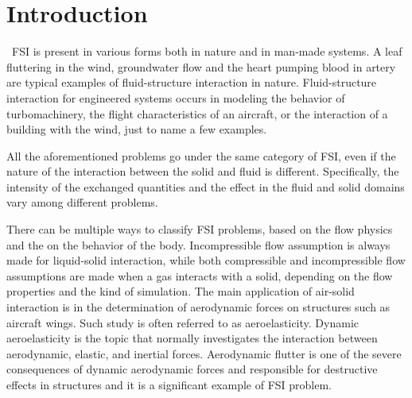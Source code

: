 \chapter{Introduction}
\label{cha:intro}





~\ac{FSI} is present in various forms both in nature and in man-made systems. A leaf fluttering in the wind, groundwater flow and the heart pumping blood in artery are typical examples of fluid-structure interaction in nature. Fluid-structure interaction for engineered systems occurs in modeling the behavior of turbomachinery, the flight characteristics of an aircraft, or the interaction of a building with the wind, just to name a few examples.

All the aforementioned problems go under the same  category of FSI, even if the nature of the interaction between the solid and fluid is different. Specifically, the intensity of the exchanged quantities and the effect in the fluid and solid domains vary among different problems.

There can be multiple ways to classify FSI problems, based on the flow physics and the on the behavior of the body. Incompressible flow assumption is always made for liquid-solid interaction, while both compressible and incompressible flow assumptions are made when a gas interacts with a solid, depending on the flow properties and the kind of simulation. The main application of air-solid interaction is in the determination of aerodynamic forces on structures such as aircraft wings. Such study is often referred to as aeroelasticity. Dynamic aeroelasticity is the topic that normally investigates the interaction between aerodynamic, elastic, and inertial forces. Aerodynamic flutter is one of the severe consequences of dynamic aerodynamic forces and responsible for destructive effects in structures and it is a significant example of FSI problem.

